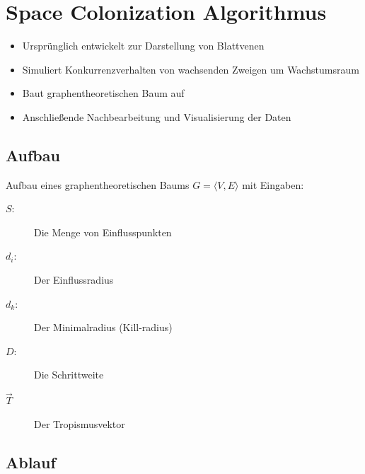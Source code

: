 \newpage
\slidetitle{}
\section{Space Colonization Algorithmus\\}

\begin{itemize}
	\item Ursprünglich entwickelt zur Darstellung von Blattvenen \\
	
	\item Simuliert Konkurrenzverhalten von wachsenden Zweigen um Wachstumsraum\\
	
	\item Baut graphentheoretischen Baum auf \\
	
	\item Anschließende Nachbearbeitung und Visualisierung der Daten
\end{itemize}




\newpage
{}
\subsection{Aufbau}
Aufbau eines graphentheoretischen Baums $G = \langle V,E \rangle$ mit Eingaben:
\begin{description}
\item[\boldmath$S:$] Die Menge von Einflusspunkten\\

\item[\boldmath$d_i:$] Der Einflussradius\\

\item[\boldmath$d_k:$] Der Minimalradius (Kill-radius)\\

\item[\boldmath$D:$] Die Schrittweite\\

\item[\boldmath$\overrightarrow{T}$] Der Tropismusvektor
\end{description}




\newpage
{}
\subsection{Ablauf}


